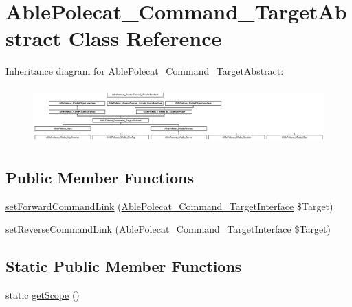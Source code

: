 \hypertarget{class_able_polecat___command___target_abstract}{}\section{Able\+Polecat\+\_\+\+Command\+\_\+\+Target\+Abstract Class Reference}
\label{class_able_polecat___command___target_abstract}
Inheritance diagram for Able\+Polecat\+\_\+\+Command\+\_\+\+Target\+Abstract\+:\begin{figure}[H]
\begin{center}
\leavevmode
\includegraphics[height=2.167742cm]{class_able_polecat___command___target_abstract}
\end{center}
\end{figure}
\subsection*{Public Member Functions}
\begin{DoxyCompactItemize}
\item 
\hyperlink{class_able_polecat___command___target_abstract_aaff1150e0dda06868b9ae7b2a3b9b095}{set\+Forward\+Command\+Link} (\hyperlink{interface_able_polecat___command___target_interface}{Able\+Polecat\+\_\+\+Command\+\_\+\+Target\+Interface} \$Target)
\item 
\hyperlink{class_able_polecat___command___target_abstract_af3c33319c9af5cebf6598ce57dfcaf49}{set\+Reverse\+Command\+Link} (\hyperlink{interface_able_polecat___command___target_interface}{Able\+Polecat\+\_\+\+Command\+\_\+\+Target\+Interface} \$Target)
\end{DoxyCompactItemize}
\subsection*{Static Public Member Functions}
\begin{DoxyCompactItemize}
\item 
static \hyperlink{class_able_polecat___command___target_abstract_ad9ade868bd136d32967059d1cccb3e92}{get\+Scope} ()
\end{DoxyCompactItemize}
